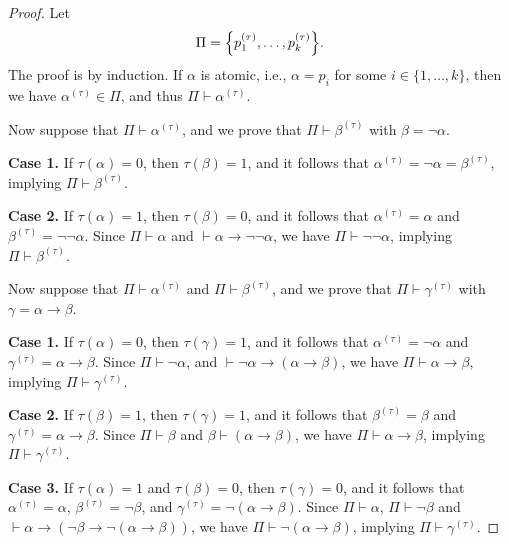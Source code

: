 \begin{proof}
  Let
  \begin{equation*}
    \Pi = \Bigl\{p_1^{(\tau)}, \dots, p_k^{(\tau)}\Bigr\}.
  \end{equation*}
  The proof is by induction.
  If $\alpha$ is atomic, i.e., $\alpha = p_i$ for some $i \in \{1, \dots, k\}$,
  then we have $\alpha^{(\tau)} \in \Pi$, and thus $\Pi \vdash
  \alpha^{(\tau)}$.

  Now suppose that $\Pi \vdash \alpha^{(\tau)}$, and we prove that $\Pi \vdash
  \beta^{(\tau)}$ with $\beta = \neg\alpha$.

  \textbf{Case 1.}
  If $\tau(\alpha) = 0$, then $\tau(\beta) = 1$, and it follows that
  $\alpha^{(\tau)} = \neg\alpha = \beta^{(\tau)}$, implying
  $\Pi \vdash \beta^{(\tau)}$.

  \textbf{Case 2.}
  If $\tau(\alpha) = 1$, then $\tau(\beta) = 0$, and it follows that
  $\alpha^{(\tau)} = \alpha$ and $\beta^{(\tau)} = \neg\neg\alpha$.
  Since $\Pi \vdash \alpha$ and $\vdash \alpha \to \neg\neg\alpha$, we have
  $\Pi \vdash \neg\neg\alpha$, implying $\Pi \vdash \beta^{(\tau)}$.

  Now suppose that $\Pi \vdash \alpha^{(\tau)}$ and $\Pi \vdash
  \beta^{(\tau)}$, and we prove that $\Pi \vdash \gamma^{(\tau)}$ with
  $\gamma = \alpha \to \beta$.

  \textbf{Case 1.}
  If $\tau(\alpha) = 0$, then $\tau(\gamma) = 1$, and it follows that
  $\alpha^{(\tau)} = \neg\alpha$ and $\gamma^{(\tau)} = \alpha \to \beta$.
  Since $\Pi \vdash \neg\alpha$, and $\vdash \neg\alpha \to (\alpha \to
  \beta)$, we have $\Pi \vdash \alpha \to \beta$, implying $\Pi \vdash
  \gamma^{(\tau)}$.

  \textbf{Case 2.}
  If $\tau(\beta) = 1$, then $\tau(\gamma) = 1$, and it follows that
  $\beta^{(\tau)} = \beta$ and $\gamma^{(\tau)} = \alpha \to \beta$.
  Since $\Pi \vdash \beta$ and $\beta \vdash (\alpha \to \beta)$, we have
  $\Pi \vdash \alpha \to \beta$, implying $\Pi \vdash \gamma^{(\tau)}$.
  
  \textbf{Case 3.}
  If $\tau(\alpha) = 1$ and $\tau(\beta) = 0$, then $\tau(\gamma) = 0$, and it
  follows that $\alpha^{(\tau)} = \alpha$, $\beta^{(\tau)} = \neg\beta$, and
  $\gamma^{(\tau)} = \neg(\alpha \to \beta)$.
  Since $\Pi \vdash \alpha$, $\Pi \vdash \neg\beta$ and $\vdash \alpha \to
  (\neg\beta \to \neg(\alpha \to \beta))$, we have $\Pi \vdash \neg(\alpha \to
  \beta)$, implying $\Pi \vdash \gamma^{(\tau)}$.
\end{proof}

